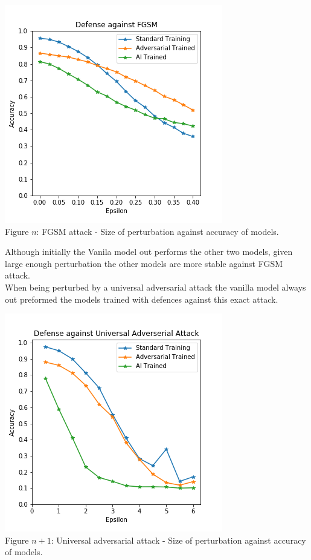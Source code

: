 \begin{center}
	\includegraphics[scale=0.5]{Advsarial_code/figures/doc_defense_against_FGSM.png}\\
	Figure $n$: FGSM attack - Size of perturbation against accuracy of models. 
\end{center}

Although initially the Vanila model out performs the other two models, given large enough perturbation the other models are more stable against FGSM attack.\\ 

When being perturbed by a universal adversarial attack the vanilla model always out preformed the models trained with defences against this exact attack. 

\begin{center}
	\includegraphics[scale=0.5]{Advsarial_code/figures/doc_defense_against_UAA.png}\\
	Figure $n + 1$: Universal adversarial attack - Size of perturbation against accuracy of models.
\end{center}

